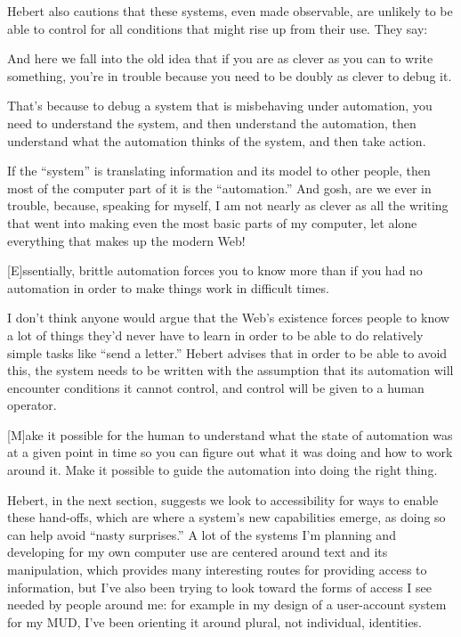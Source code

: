\documentclass[11pt]{article}
\begin{document}
\begin{itemize}
Hebert also cautions that these systems, even made observable, are unlikely to be able to control for all conditions that might rise up from their use. They say:

And here we fall into the old idea that if you are as clever as you can to write something, you're in trouble because you need to be doubly as clever to debug it.

That's because to debug a system that is misbehaving under automation, you need to understand the system, and then understand the automation, then understand what the automation thinks of the system, and then take action.

If the “system” is translating information and its model to other people, then most of the computer part of it is the “automation.” And gosh, are we ever in trouble, because, speaking for myself, I am not nearly as clever as all the writing that went into making even the most basic parts of my computer, let alone everything that makes up the modern Web!

[E]ssentially, brittle automation forces you to know more than if you had no automation in order to make things work in difficult times.

I don’t think anyone would argue that the Web’s existence forces people to know a lot of things they’d never have to learn in order to be able to do relatively simple tasks like “send a letter.” Hebert advises that in order to be able to avoid this, the system needs to be written with the assumption that its automation will encounter conditions it cannot control, and control will be given to a human operator.

[M]ake it possible for the human to understand what the state of automation was at a given point in time so you can figure out what it was doing and how to work around it. Make it possible to guide the automation into doing the right thing.

Hebert, in the next section, suggests we look to accessibility for ways to enable these hand-offs, which are where a system’s new capabilities emerge, as doing so can help avoid “nasty surprises.” A lot of the systems I’m planning and developing for my own computer use are centered around text and its manipulation, which provides many interesting routes for providing access to information, but I’ve also been trying to look toward the forms of access I see needed by people around me: for example in my design of a user-account system for my MUD, I’ve been orienting it around plural, not individual, identities.


\end{itemize}
\end{document}
